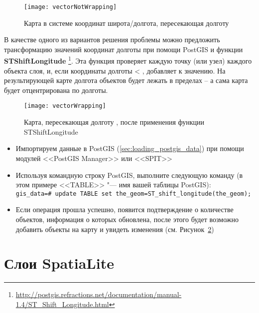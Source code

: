 \begin{figure}[ht]
   \centering
   \texttt{[image: vectorNotWrapping]}
      \caption{Карта в системе координат широта/долгота, пересекающая долготу  \nixcaption}
   \label{fig:vector_not_wrapping}
\end{figure}

В качестве одного из вариантов решения проблемы можно предложить трансформацию
значений координат долготы при помощи PostGIS и функции
\textbf{ST\textunderscore Shift\textunderscore Longitude}
\footnote{\url{http://postgis.refractions.net/documentation/manual-1.4/ST\_Shift\_Longitude.html}}.
Эта функция проверяет каждую точку (или узел) каждого объекта слоя, и,
если координаты долготы < , добавляет  к значению.
На результирующей карте долгота объектов будет лежать в пределах
 --  а сама карта будет отцентрирована по
 долготы.

\begin{figure}[ht]
   \centering
   \texttt{[image: vectorWrapping]}
   \caption{Карта, пересекающая долготу , после применения функции ST\textunderscore Shift\textunderscore Longitude \nixcaption}
\label{fig:vector_wrapping}
\end{figure}


\begin{itemize}[label=--]
\item Импортируем данные в PostGIS (\ref{sec:loading_postgis_data}) при помощи
модулей <<PostGIS Manager>> или <<SPIT>>
\item Используя командную строку PostGIS, выполните следующую команду
(в этом примере <<TABLE>> "--- имя вашей таблицы PostGIS): \\
\texttt{gis\_data=\# update TABLE set the\_geom=ST\_shift\_longitude(the\_geom);}
\item Если операция прошла успешно, появится подтверждение о количестве
объектов, информация о которых обновлена, после этого будет возможно добавить
объекты на карту и увидеть изменения (см. Рисунок~\ref{fig:vector_wrapping})
\end{itemize}

\section{Слои SpatiaLite}
\label{label_spatialite}

